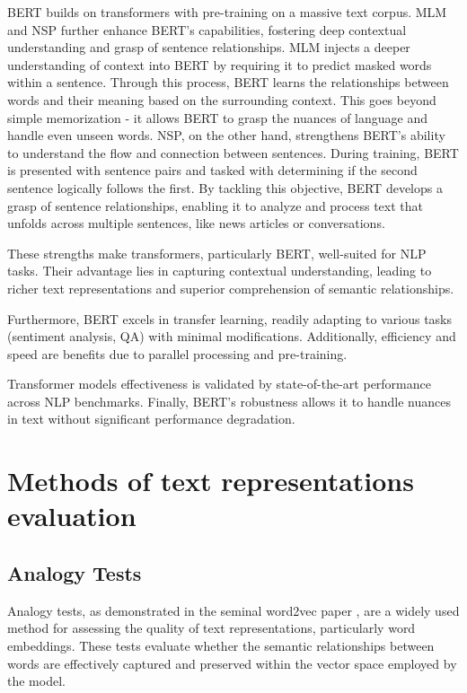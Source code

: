 BERT \cite{devlin2019bert} builds on transformers with pre-training on a massive text corpus.
\ac{MLM} and \ac{NSP} further enhance \ac{BERT}'s capabilities, fostering deep contextual understanding and grasp of sentence relationships.
\ac{MLM} injects a deeper understanding of context into \ac{BERT} by requiring it to predict masked words within a sentence.
Through this process, \ac{BERT} learns the relationships between words and their meaning based on the surrounding context.
This goes beyond simple memorization - it allows \ac{BERT} to grasp the nuances of language and handle even unseen words.
\ac{NSP}, on the other hand, strengthens \ac{BERT}'s ability to understand the flow and connection between sentences.
During training, \ac{BERT} is presented with sentence pairs and tasked with determining if the second sentence logically follows the first. 
By tackling this objective, \ac{BERT} develops a grasp of sentence relationships, enabling it to analyze and process text that unfolds across multiple sentences, like news articles or conversations.


These strengths make transformers, particularly \ac{BERT}, well-suited for \ac{NLP} tasks.
Their advantage lies in capturing contextual understanding, leading to richer text representations and superior comprehension of semantic relationships.

Furthermore, \ac{BERT} excels in transfer learning, readily adapting to various tasks (sentiment analysis, \ac{QA}) with minimal modifications.
Additionally, efficiency and speed are benefits due to parallel processing and pre-training.

Transformer models effectiveness is validated by state-of-the-art performance across \ac{NLP} benchmarks.
Finally, \ac{BERT}'s robustness allows it to handle nuances in text without significant performance degradation.

\section{Methods of text representations evaluation}

\subsection{Analogy Tests}

Analogy tests, as demonstrated in the seminal word2vec paper \cite{mikolov2013efficient}, are a widely used method for assessing the quality of text representations, particularly word embeddings.
These tests evaluate whether the semantic relationships between words are effectively captured and preserved within the vector space employed by the model.


